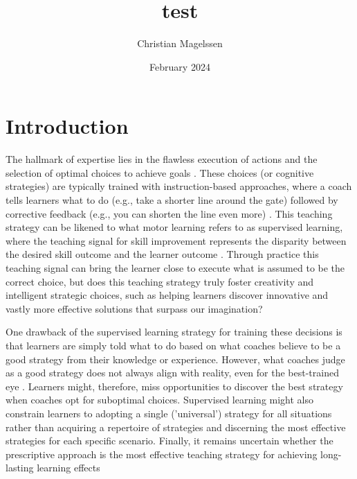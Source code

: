 \documentclass{article}
\title{test}
\author{Christian Magelssen}
\date{February 2024}
\begin{document}
\maketitle

\section{Introduction}

The hallmark of expertise lies in the flawless execution of actions and the selection of optimal choices to achieve goals  \cite{wolpert_principles_2011, krakauer_motor_2019, mangalam_investigating_2023, du_relationship_2022, gallivan_decision-making_2018}. These choices (or cognitive strategies) are typically trained with instruction-based approaches, where a coach tells learners what to do (e.g., take a shorter line around the gate) followed by corrective feedback (e.g., you can shorten the line even more) \cite{williams_practice_2005, williams_effective_2023, hodges_role_1999}. This teaching strategy can be likened to what motor learning refers to as supervised learning, where the teaching signal for skill improvement represents the disparity between the desired skill outcome and the learner outcome \cite{jordan_forward_1992, wolpert_motor_2010, doya_complementary_2000}. Through practice this teaching signal can bring the learner close to execute what is assumed to be the correct choice, but does this teaching strategy truly foster creativity and intelligent strategic choices, such as helping learners discover innovative and vastly more effective solutions that surpass our imagination?

One drawback of the supervised learning strategy for training these decisions is that learners are simply told what to do based on what coaches believe to be a good strategy from their knowledge or experience. However, what coaches judge as a good strategy does not always align with reality, even for the best-trained eye \cite{supej_impact_2019, cochrum_visual_2021}. Learners might, therefore, miss opportunities to discover the best strategy when coaches opt for suboptimal choices. Supervised learning might also constrain learners to adopting a single ('universal') strategy for all situations rather than acquiring a repertoire of strategies and discerning the most effective strategies for each specific scenario. Finally, it remains uncertain whether the prescriptive approach is the most effective teaching strategy for achieving long-lasting learning effects \cite{wulf_instructions} 
\end{document}

